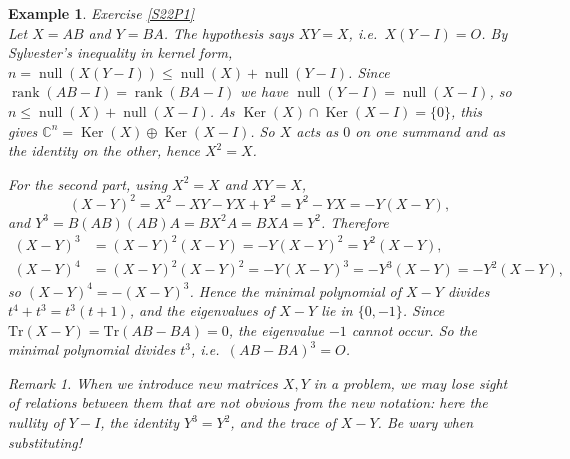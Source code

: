 \documentclass[12pt]{article}
\renewcommand{\Tr}{\mathrm{Tr}}
\DeclareMathOperator{\Rank}{rank}
\DeclareMathOperator{\Null}{null}
\DeclareMathOperator{\Ker}{Ker}
\theoremstyle{breakplain}
\theoremstyle{breakdef}
\newtheorem*{example}{Example}
\theoremstyle{remark}
\newtheorem*{remark}{Remark}
\begin{document}
\begin{example}Exercise \ref{S22P1}\\
        Let $X=AB$ and $Y=BA$. The hypothesis says $XY=X$, i.e.\ $X(Y-I)=O$. By Sylvester's inequality in kernel form, $n=\Null(X(Y-I))\leq\Null(X)+\Null(Y-I)$. Since $\Rank(AB-I)=\Rank(BA-I)$ we have $\Null(Y-I)=\Null(X-I)$, so $n\leq \Null(X)+\Null(X-I)$. As $\Ker(X) \cap \Ker(X-I)=\{0\}$, this gives $\mathbb{C}^n=\Ker(X)\oplus\Ker(X-I)$. So $X$ acts as $0$ on one summand and as the identity on the other, hence $X^2=X$.

        For the second part, using $X^2=X$ and $XY=X$,
        \[(X-Y)^2=X^2-XY-YX+Y^2=Y^2-YX=-Y(X-Y),\]
        and $Y^3=B(AB)(AB)A=BX^2A=BXA=Y^2$. Therefore
        \begin{align*}
            (X-Y)^3&=(X-Y)^2(X-Y)=-Y(X-Y)^2=Y^2(X-Y),\\
            (X-Y)^4&=(X-Y)^2(X-Y)^2=-Y(X-Y)^3=-Y^3(X-Y)=-Y^2(X-Y),
        \end{align*}
        so $(X-Y)^4=-(X-Y)^3$. Hence the minimal polynomial of $X-Y$ divides $t^4+t^3=t^3(t+1)$, and the eigenvalues of $X-Y$ lie in $\{0,-1\}$. Since $\Tr(X-Y)=\Tr(AB-BA)=0$, the eigenvalue $-1$ cannot occur. So the minimal polynomial divides $t^3$, i.e.\ $(AB-BA)^3=O$.
    \begin{remark}
        When we introduce new matrices $X,Y$ in a problem, we may lose sight of relations between them that are not obvious from the new notation: here the nullity of $Y-I$, the identity $Y^3=Y^2$, and the trace of $X-Y$. Be wary when substituting!
    \end{remark}
\end{example}
\end{document}
